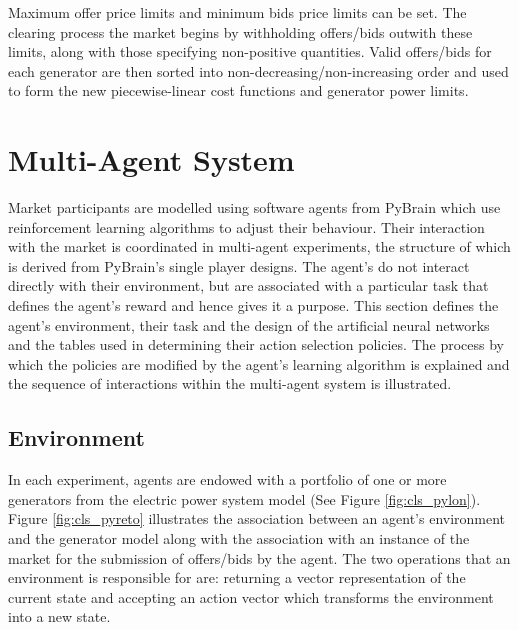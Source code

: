 Maximum offer price limits and minimum bids price limits can be set.  The
clearing process the market begins by withholding offers/bids outwith these
limits, along with those specifying non-positive quantities. Valid offers/bids
for each generator are then sorted into non-decreasing/non-increasing order
and used to form the new piecewise-linear cost functions and generator power
limits.

\section{Multi-Agent System}
\label{sec:mas}
Market participants are modelled using software agents from PyBrain
\cite{schaul:2010} which use reinforcement learning algorithms to adjust their
behaviour.  Their interaction with the market is coordinated in multi-agent
experiments, the structure of which is derived from PyBrain's single player
designs.  The agent's do not interact directly with their environment, but are
associated with a particular task that defines the agent's reward and hence
gives it a purpose.  This section defines the agent's environment, their
task and the design of the artificial neural networks and the tables used in
determining their action selection policies.  The process by which the policies
are modified by the agent's learning algorithm is explained and the sequence
of interactions within the multi-agent system is illustrated.

\subsection{Environment}
In each experiment, agents are endowed with a portfolio of one or more
generators from the electric power system model (See Figure
\ref{fig:cls_pylon}). Figure \ref{fig:cls_pyreto} illustrates the association
between an agent's environment and the generator model along with the
association with an instance of the market for the submission of offers/bids by
the agent. The two operations that an environment is responsible for
are: returning a vector representation of the current state and accepting an
action vector which transforms the environment into a new state.

%

